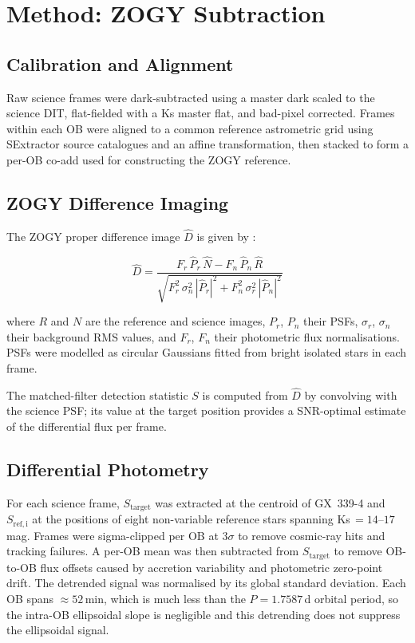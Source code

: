 \documentclass[12pt,a4paper]{article}
\begin{document}
\section{Method: ZOGY Subtraction}
\label{sec:zogy}

\subsection{Calibration and Alignment}

Raw science frames were dark-subtracted using a master dark scaled
to the science DIT, flat-fielded with a Ks master flat, and
bad-pixel corrected.  Frames within each OB were aligned to a common
reference astrometric grid using SExtractor source catalogues and an
affine transformation, then stacked to form a per-OB co-add used
for constructing the ZOGY reference.

\subsection{ZOGY Difference Imaging}

The ZOGY proper difference image $\hat{D}$ is given by
\cite{Zackay2016}:

\begin{equation}
  \hat{D} = \frac{F_r\,\hat{P}_r\,\hat{N} - F_n\,\hat{P}_n\,\hat{R}}
                 {\sqrt{F_r^2\,\sigma_n^2\,|\hat{P}_r|^2 +
                        F_n^2\,\sigma_r^2\,|\hat{P}_n|^2}}
  \label{eq:D}
\end{equation}

where $R$ and $N$ are the reference and science images, $P_r$,
$P_n$ their PSFs, $\sigma_r$, $\sigma_n$ their background RMS
values, and $F_r$, $F_n$ their photometric flux normalisations.
PSFs were modelled as circular Gaussians fitted from bright
isolated stars in each frame.

The matched-filter detection statistic $S$ is computed from
$\hat{D}$ by convolving with the science PSF; its value at the
target position provides a SNR-optimal estimate of the differential
flux per frame.

\subsection{Differential Photometry}

For each science frame, $S_\mathrm{target}$ was extracted at the
centroid of GX~339-4 and $S_\mathrm{ref,i}$ at the positions of
eight non-variable reference stars spanning Ks\,$= 14$--$17$\,mag.
Frames were sigma-clipped per OB at $3\sigma$ to remove cosmic-ray
hits and tracking failures.  A per-OB mean was then subtracted from
$S_\mathrm{target}$ to remove OB-to-OB flux offsets caused by
accretion variability and photometric zero-point drift.  The
detrended signal was normalised by its global standard deviation.
Each OB spans $\approx 52$\,min, which is much less than the
$P = 1.7587$\,d orbital period, so the intra-OB ellipsoidal slope
is negligible and this detrending does not suppress the ellipsoidal
signal.
\end{document}
